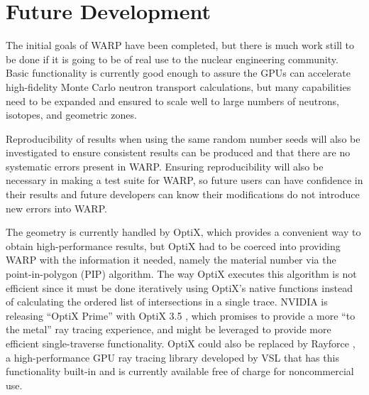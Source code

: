 \documentclass[preprint,12pt]{elsarticle}
\begin{document}
\section{Future Development}
\label{sec:dev}

The initial goals of WARP have been completed, but there is much work still to be done if it is going to be of real use to the nuclear engineering community.  Basic functionality is currently good enough to assure the GPUs can accelerate high-fidelity Monte Carlo neutron transport calculations, but many capabilities need to be expanded and ensured to scale well to large numbers of neutrons, isotopes, and geometric zones.  

Reproducibility of results when using the same random number seeds will also be investigated to ensure consistent results can be produced and that there are no systematic errors present in WARP.  Ensuring reproducibility will also be necessary in making a test suite for WARP, so future users can have confidence in their results and future developers can know their modifications do not introduce new errors into WARP.

The geometry is currently handled by OptiX, which provides a convenient way to obtain high-performance results, but OptiX had to be coerced into providing WARP with the information it needed, namely the material number via the point-in-polygon (PIP) algorithm.  The way OptiX executes this algorithm is not efficient since it must be done iteratively using OptiX's native functions instead of calculating the ordered list of intersections in a single trace.  NVIDIA is releasing ``OptiX Prime'' with OptiX 3.5 \cite{optix3.5}, which promises to provide a more ``to the metal'' ray tracing experience, and might be leveraged to provide more efficient single-traverse functionality.  OptiX could also be replaced by Rayforce \cite{rayforce}, a high-performance GPU ray tracing library developed by VSL that has this functionality built-in and is currently available free of charge for noncommercial use.

\end{document}
